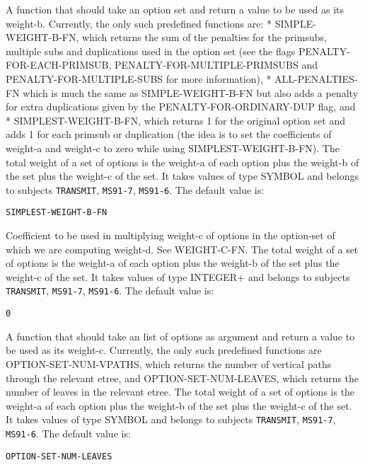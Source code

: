 \begin{description}
\item[WEIGHT-B-FN]  
A function that should take an option set and return a value 
to be used as its weight-b. Currently, the only such predefined functions are: 
* SIMPLE-WEIGHT-B-FN, which returns the sum of the penalties for the primsubs, 
  multiple subs and duplications used in the option set (see the flags 
  PENALTY-FOR-EACH-PRIMSUB, PENALTY-FOR-MULTIPLE-PRIMSUBS and  
  PENALTY-FOR-MULTIPLE-SUBS for more information),
* ALL-PENALTIES-FN which is much the same as SIMPLE-WEIGHT-B-FN but also adds
  a penalty for extra duplications given by the PENALTY-FOR-ORDINARY-DUP 
  flag, and 
* SIMPLEST-WEIGHT-B-FN, which returns 1 for the original option set and adds 
  1 for each primsub or duplication (the idea is to set the coefficients of 
  weight-a and weight-c to zero while using SIMPLEST-WEIGHT-B-FN).
The total weight of a set of options is the weight-a of each option
plus the weight-b of the set plus the weight-c of the set.
It takes values of type SYMBOL and belongs to subjects \texttt{TRANSMIT}, \texttt{MS91-7}, \texttt{MS91-6}.  The default value is: \begin{lstlisting}
SIMPLEST-WEIGHT-B-FN
\end{lstlisting}

\item[WEIGHT-C-COEFFICIENT]  
Coefficient to be used in multiplying weight-c of options in
the option-set of which we are computing weight-d. See WEIGHT-C-FN.
The total weight of a set of options is the weight-a of each option
plus the weight-b of the set plus the weight-c of the set.
It takes values of type INTEGER+ and belongs to subjects \texttt{TRANSMIT}, \texttt{MS91-7}, \texttt{MS91-6}.  The default value is: \begin{lstlisting}
0
\end{lstlisting}

\item[WEIGHT-C-FN]  
A function that should take an list of options as argument and
return a value to be used as its weight-c. Currently, the only such 
predefined functions are OPTION-SET-NUM-VPATHS, which returns the number of
vertical paths through the relevant etree, and OPTION-SET-NUM-LEAVES, which 
returns the number of leaves in the relevant etree.
The total weight of a set of options is the weight-a of each option
plus the weight-b of the set plus the weight-c of the set.
It takes values of type SYMBOL and belongs to subjects \texttt{TRANSMIT}, \texttt{MS91-7}, \texttt{MS91-6}.  The default value is: \begin{lstlisting}
OPTION-SET-NUM-LEAVES
\end{lstlisting}

\item
\end{description}


